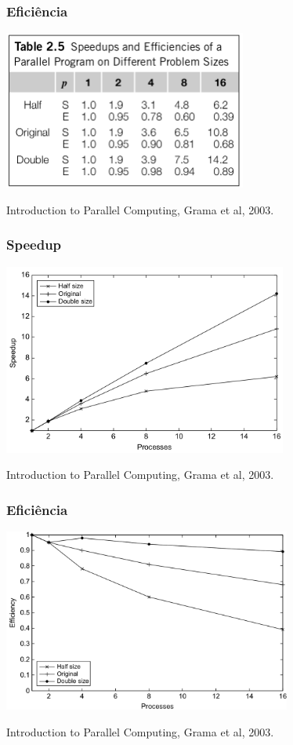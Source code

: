 \documentclass[xcolor={usenames,dvipsnames},12pt,presentation,aspectratio=169]{beamer}
\begin{document}
\begin{frame}[fragile]
  \frametitle{Eficiência}
   \begin{center}
 	\includegraphics[width=0.6\textwidth]{speedup2.png}
   \end{center}
   \vfill
   {\tiny Introduction to Parallel Computing, Grama et al, 2003.}
\end{frame}
\begin{frame}[fragile]
  \frametitle{Speedup}
  \vspace{-3mm}
   \begin{center}
 	\includegraphics[width=0.7\textwidth]{speedup3.png}
   \end{center}
   \vfill
   {\tiny Introduction to Parallel Computing, Grama et al, 2003.}
\end{frame}
\begin{frame}[fragile]
  \frametitle{Eficiência}
  \vspace{-3mm}
   \begin{center}
 	\includegraphics[width=0.71\textwidth]{speedup4.png}
   \end{center}
   \vfill
   {\tiny Introduction to Parallel Computing, Grama et al, 2003.}
\end{frame}
\end{document}
